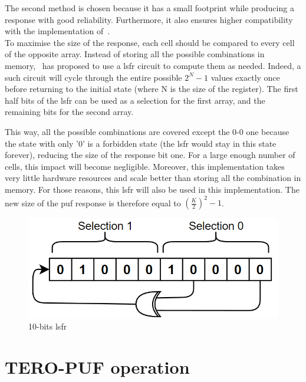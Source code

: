 The second method is chosen because it has a small footprint while producing a response with good reliability. Furthermore, it also ensures higher compatibility with the implementation of~\cite{de_weerdt_implementation_2021}.\\

To maximise the size of the response, each cell should be compared to every cell of the opposite array. Instead of storing all the possible combinations in memory,~\cite{de_weerdt_implementation_2021} has proposed to use a \acrfull{lsfr} circuit to compute them as needed. Indeed, a such circuit will cycle through the entire possible $2^{N} -1$ values exactly once before returning to the initial state (where N is the size of the register). The first half bits of the \acrshort{lsfr} can be used as a selection for the first array, and the remaining bits for the second array.

This way, all the possible combinations are covered except the 0-0 one because the state with only '0' is a forbidden state (the \acrshort{lsfr} would stay in this state forever), reducing the size of the response bit one. For a large enough number of cells, this impact will become negligible. Moreover, this implementation takes very little hardware resources and scale better than storing all the combination in memory. For those reasons, this \acrshort{lsfr} will also be used in this implementation. The new size of the \acrshort{puf} response is therefore equal to $\left ( \frac{K}{2}\right )^2 -1$.

\begin{figure}[H]
    \centering
    \includegraphics[width=0.5\linewidth]{images/LSFR.png}
    \caption{10-bits \acrshort{lsfr}}
    \label{fig:LSFR}
\end{figure}

\section{TERO-PUF operation}
\label{sec:design_operation}

